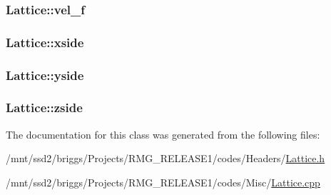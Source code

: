 \hypertarget{class_lattice_a3708edbed93bfc09621fbef748019510}{
\subsubsection[{vel\-\_\-f}]{ Lattice\-::vel\-\_\-f\hspace{0.3cm}{\ttfamily [static]}}}\label{class_lattice_a3708edbed93bfc09621fbef748019510}
\hypertarget{class_lattice_aa6dc2444043ffc26fe9b1e8f3eb76969}{
\subsubsection[{xside}]{ Lattice\-::xside\hspace{0.3cm}{\ttfamily [static]}}}\label{class_lattice_aa6dc2444043ffc26fe9b1e8f3eb76969}
\hypertarget{class_lattice_a5bf9c8b8ee3516d96f1772e3c36311b8}{
\subsubsection[{yside}]{ Lattice\-::yside\hspace{0.3cm}{\ttfamily [static]}}}\label{class_lattice_a5bf9c8b8ee3516d96f1772e3c36311b8}
\hypertarget{class_lattice_ae1835921fe7bacab93f316472c11ce9f}{
\subsubsection[{zside}]{ Lattice\-::zside\hspace{0.3cm}{\ttfamily [static]}}}\label{class_lattice_ae1835921fe7bacab93f316472c11ce9f}


The documentation for this class was generated from the following files\-:\begin{DoxyCompactItemize}
\item 
/mnt/ssd2/briggs/\-Projects/\-R\-M\-G\-\_\-\-R\-E\-L\-E\-A\-S\-E1/codes/\-Headers/\hyperlink{_lattice_8h}{Lattice.\-h}\item 
/mnt/ssd2/briggs/\-Projects/\-R\-M\-G\-\_\-\-R\-E\-L\-E\-A\-S\-E1/codes/\-Misc/\hyperlink{_lattice_8cpp}{Lattice.\-cpp}\end{DoxyCompactItemize}
